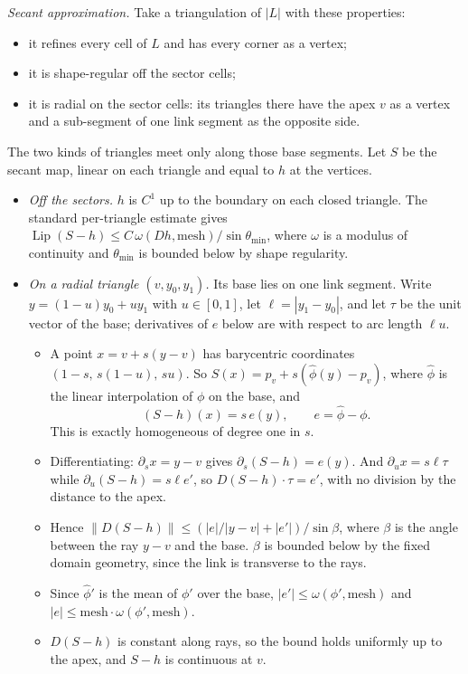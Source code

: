 \documentclass[preprint,12pt]{elsarticle}
\theoremstyle{definition}
\theoremstyle{remark}
\begin{document}
\emph{Secant approximation.} Take a triangulation of $|L|$ with these properties:
\begin{itemize}
\item it refines every cell of $L$ and has every corner as a vertex;
\item it is shape-regular off the sector cells;
\item it is radial on the sector cells: its triangles there have the apex $v$ as a vertex and a sub-segment of one link
segment as the opposite side.
\end{itemize}
The two kinds of triangles meet only along those base segments. Let $S$ be the secant map, linear on each triangle and
equal to $h$ at the vertices.
\begin{itemize}
\item \emph{Off the sectors.} $h$ is $C^1$ up to the boundary on each closed triangle. The standard per-triangle
estimate gives $\operatorname{Lip}(S-h)\le C\,\omega(Dh,\mathrm{mesh})/\sin\theta_{\min}$, where $\omega$ is a modulus
of continuity and $\theta_{\min}$ is bounded below by shape regularity.
\item \emph{On a radial triangle $(v,y_0,y_1)$.} Its base lies on one link segment. Write $y=(1-u)y_0+uy_1$ with
$u\in[0,1]$, let $\ell=|y_1-y_0|$, and let $\tau$ be the unit vector of the base; derivatives of $e$ below are with
respect to arc length $\ell u$.
  \begin{itemize}
  \item A point $x=v+s(y-v)$ has barycentric coordinates $(1-s,\,s(1-u),\,su)$. So $S(x)=p_v+s(\hat\phi(y)-p_v)$,
  where $\hat\phi$ is the linear interpolation of $\phi$ on the base, and
  \[
  (S-h)(x)=s\,e(y),\qquad e=\hat\phi-\phi .
  \]
  This is exactly homogeneous of degree one in $s$.
  \item Differentiating: $\partial_s x=y-v$ gives $\partial_s(S-h)=e(y)$. And $\partial_u x=s\ell\tau$ while
  $\partial_u(S-h)=s\ell e'$, so $D(S-h)\cdot\tau=e'$, with no division by the distance to the apex.
  \item Hence $\|D(S-h)\|\le(|e|/|y-v|+|e'|)/\sin\beta$, where $\beta$ is the angle between the ray $y-v$ and the base.
  $\beta$ is bounded below by the fixed domain geometry, since the link is transverse to the rays.
  \item Since $\hat\phi'$ is the mean of $\phi'$ over the base, $|e'|\le\omega(\phi',\mathrm{mesh})$ and
  $|e|\le\mathrm{mesh}\cdot\omega(\phi',\mathrm{mesh})$.
  \item $D(S-h)$ is constant along rays, so the bound holds uniformly up to the apex, and $S-h$ is continuous at $v$.

\end{itemize}
\end{itemize}
\end{document}
